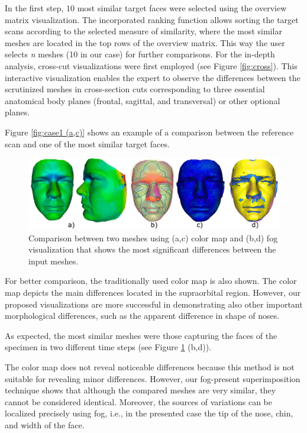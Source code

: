 \documentclass[final,5p,times]{elsarticle}
\begin{document}
In the first step, $10$ most similar target faces were selected using the overview matrix visualization.
The incorporated ranking function allows sorting the target scans according to the selected measure of similarity, where the most similar meshes are located in the top rows of the overview matrix. 
This way the user selects \textit{n} meshes (10 in our case) for further comparisons. 
For the in-depth analysis, cross-cut visualizations were first employed (see Figure \ref{fig:cross}).
This interactive visualization enables the expert to observe the differences between the scrutinized meshes in cross-section cuts corresponding to three essential anatomical body planes (frontal, sagittal, and transversal) or other optional planes. 

Figure \ref{fig:case1 (a,c)} shows an example of a comparison between the reference scan and one of the most similar target faces. 

\begin{figure}[htb]
	\centering
  \includegraphics[width=1.0\linewidth]{pictures/case1.png}
  \caption{\label{fig:case1}Comparison between two meshes using (a,c) color map and (b,d) fog visualization  that shows the most significant differences between the input meshes.}
\end{figure}

For better comparison, the traditionally used color map is also shown.
The color map depicts the main differences located in the supraorbital region. 
However, our proposed visualizations are more successful in demonstrating also other important morphological differences, such as the apparent difference in shape of noses.
 
As expected, the most similar meshes were those capturing the faces of the specimen in two different time steps (see Figure \ref{fig:case1} (b,d)).  

The color map does not reveal noticeable differences because this method is not suitable for revealing minor differences.
However, our fog-present superimposition technique shows that although the compared meshes are very similar, they cannot be considered identical. Moreover, the sources of variations can be localized precisely using fog, i.e., in the presented case the tip of the nose, chin, and width of the face.
\end{document}
